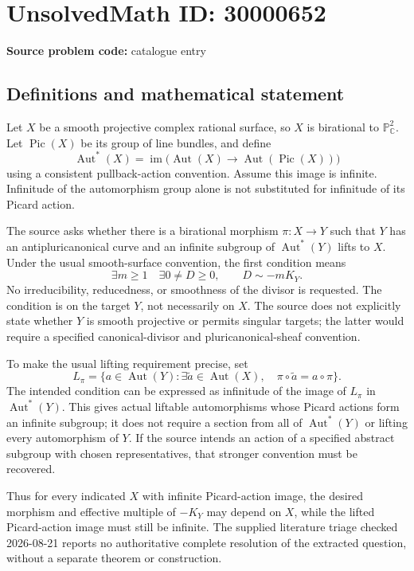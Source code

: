 \documentclass[11pt]{article}
\newcommand{\C}{\mathbb{C}}
\newcommand{\PP}{\mathbb{P}}
\begin{document}
\section*{UnsolvedMath ID: 30000652}
\textbf{Source problem code:} catalogue entry
\subsection{Definitions and mathematical statement}
Let \(X\) be a smooth projective complex rational surface, so \(X\) is birational to \(\PP^2_\C\). Let \(\operatorname{Pic}(X)\) be its group of line bundles, and define
\[
\operatorname{Aut}^*(X)=\operatorname{im}\bigl(\operatorname{Aut}(X)\to\operatorname{Aut}(\operatorname{Pic}(X))\bigr)
\]
using a consistent pullback-action convention. Assume this image is infinite. Infinitude of the automorphism group alone is not substituted for infinitude of its Picard action.

The source asks whether there is a birational morphism \(\pi:X\to Y\) such that \(Y\) has an antipluricanonical curve and an infinite subgroup of \(\operatorname{Aut}^*(Y)\) lifts to \(X\). Under the usual smooth-surface convention, the first condition means
\[
\exists m\geq1\quad\exists 0\ne D\geq0,\qquad D\sim-mK_Y.
\]
No irreducibility, reducedness, or smoothness of the divisor is requested. The condition is on the target \(Y\), not necessarily on \(X\). The source does not explicitly state whether \(Y\) is smooth projective or permits singular targets; the latter would require a specified canonical-divisor and pluricanonical-sheaf convention.

To make the usual lifting requirement precise, set
\[
L_\pi=\{a\in\operatorname{Aut}(Y):\exists\widetilde a\in\operatorname{Aut}(X),\quad
\pi\circ\widetilde a=a\circ\pi\}.
\]
The intended condition can be expressed as infinitude of the image of \(L_\pi\) in \(\operatorname{Aut}^*(Y)\). This gives actual liftable automorphisms whose Picard actions form an infinite subgroup; it does not require a section from all of \(\operatorname{Aut}^*(Y)\) or lifting every automorphism of \(Y\). If the source intends an action of a specified abstract subgroup with chosen representatives, that stronger convention must be recovered.

Thus for every indicated \(X\) with infinite Picard-action image, the desired morphism and effective multiple of \(-K_Y\) may depend on \(X\), while the lifted Picard-action image must still be infinite. The supplied literature triage checked 2026-08-21 reports no authoritative complete resolution of the extracted question, without a separate theorem or construction.
\end{document}
